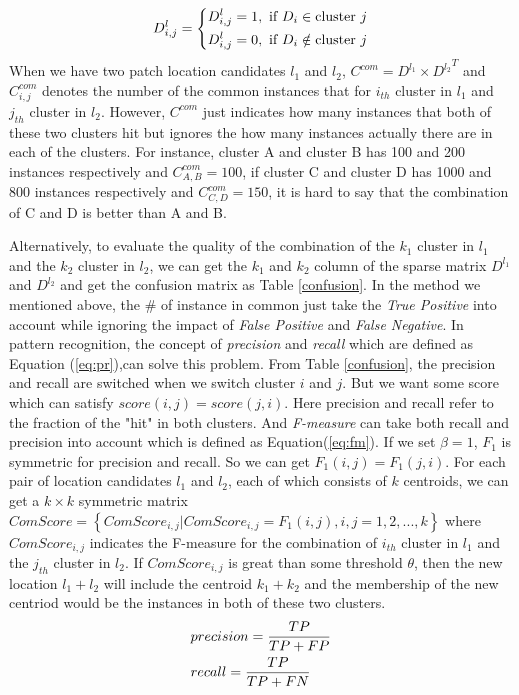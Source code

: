 \begin{equation}
  D^l _{i,j}= \left\{ \begin{gathered}
  {D^l_{i,j}} = 1,{\text{ if }}{D_i} \in {\text{cluster }}j \hfill \\
  {D^l_{i,j}} = 0,{\text{ if }}{D_i} \notin {\text{cluster }}j \hfill \\
\end{gathered}  \right.
\end{equation}
When we have two patch location candidates $l_1$ and $l_2$, $C^{com}=D^{l_1} \times {D^{l_2}}^T$ and $C^{com}_{i,j}$ denotes the number of the common instances that for $i_{th}$ cluster in $l_1$ and $j_{th}$ cluster in $l_2$. However, $C^{com}$ just indicates how many instances that both of these two clusters hit but ignores the how many instances actually there are in each of the clusters. For instance, cluster A and cluster B has 100 and 200 instances respectively and $C^{com}_{A,B}=100$, if cluster C and cluster D has 1000 and 800 instances respectively and $C^{com}_{C,D}=150$, it is hard to say that the combination of C and D is better than A and B.

Alternatively, to evaluate the quality of the combination of the $k_1$ cluster in $l_1$ and the $k_2$ cluster in $l_2$, we can get the $k_1$ and $k_2$ column of the sparse matrix $D^{l_1}$ and $D^{l_2}$ and get the confusion matrix as Table \ref{confusion}. In the method we mentioned above, the \# of instance in common just take the \emph{True Positive} into account while ignoring the impact of \emph{False Positive} and \emph{False Negative}. In pattern recognition, the concept of \emph{precision} and \emph{recall} which are defined as Equation (\ref{eq:pr}),can solve this problem\cite{powers2011evaluation}. From Table \ref{confusion}, the precision and recall are switched when we switch cluster $i$ and $j$. But we want some score which can satisfy $score(i,j) = score(j,i)$.
Here precision and recall refer to the fraction of the "hit" in both clusters. And \emph{F-measure} can take both recall and precision into account which is defined as Equation(\ref{eq:fm}). If we set $\beta = 1$, $F_1$ is symmetric for precision and recall. So we can get $F_1(i,j) = F_1(j,i)$. For each pair of location candidates $l_1$ and $l_2$, each of which consists of $k$ centroids, we can get a $k \times k$ symmetric matrix $ComScore=\left\{ComScore_{i,j}|ComScore_{i,j}=F_1(i,j),i,j=1,2,...,k \right\}$ where $ComScore_{i,j}$ indicates the F-measure for the combination of $i_{th}$ cluster in $l_1$ and the $j_{th}$ cluster in $l_2$. If $ComScore_{i,j}$ is great than some threshold $\theta$, then the new location $l_1+l_2$ will include the centroid $k_1+k_2$ and the membership of the new centriod would be the instances in both of these two clusters.
\begin{equation}\label{eq:pr}
  \begin{gathered}
  precision = \frac{{TP}}{{TP + FP}} \hfill \\
  recall = \frac{{TP}}{{TP + FN}} \hfill \\
\end{gathered}
\end{equation}

